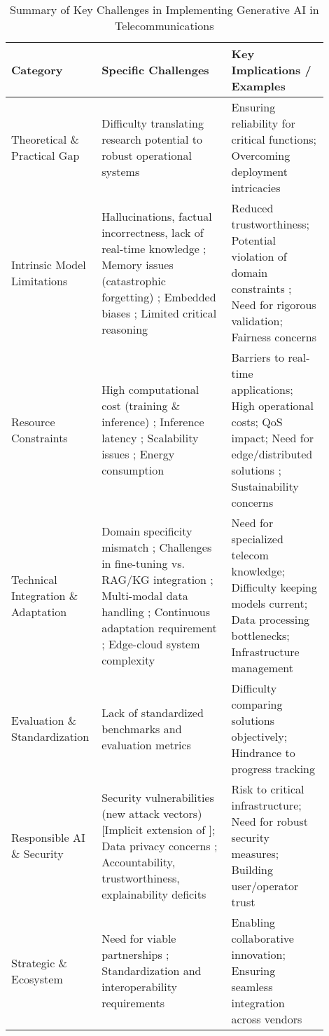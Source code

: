 \documentclass[sigconf]{acmart}
\begin{document}
\begin{table*}[htbp]
\centering
\caption{Summary of Key Challenges in Implementing Generative AI in Telecommunications}
\label{tab:genai_challenges_summary}
\begin{adjustbox}{max width=\textwidth}
\begin{tabular}{|p{0.2\linewidth}|p{0.4\linewidth}|p{0.3\linewidth}|}
\hline
\textbf{Category} & \textbf{Specific Challenges} & \textbf{Key Implications / Examples} \\
\hline
\hline
Theoretical \& Practical Gap & Difficulty translating research potential to robust operational systems \cite{ref2, ref26} & Ensuring reliability for critical functions; Overcoming deployment intricacies \cite{ref6, ref12} \\
\hline
Intrinsic Model Limitations & Hallucinations, factual incorrectness, lack of real-time knowledge \cite{ref8, ref17}; Memory issues (catastrophic forgetting) \cite{ref8}; Embedded biases \cite{ref8}; Limited critical reasoning \cite{ref6} & Reduced trustworthiness; Potential violation of domain constraints \cite{ref17}; Need for rigorous validation; Fairness concerns \\
\hline
Resource Constraints & High computational cost (training \& inference) \cite{ref3, ref8, ref31}; Inference latency \cite{ref3, ref14, ref31}; Scalability issues \cite{ref6, ref9, ref20, ref25, ref31, ref35}; Energy consumption \cite{ref29, ref31, ref34, ref35} & Barriers to real-time applications; High operational costs; QoS impact; Need for edge/distributed solutions \cite{ref3, ref14}; Sustainability concerns \\
\hline
Technical Integration \& Adaptation & Domain specificity mismatch \cite{ref4, ref17, ref18, ref25}; Challenges in fine-tuning vs. RAG/KG integration \cite{ref4, ref8, ref35}; Multi-modal data handling \cite{ref17, ref22, ref23, ref25}; Continuous adaptation requirement \cite{ref17, ref25}; Edge-cloud system complexity \cite{ref3, ref14, ref31} & Need for specialized telecom knowledge; Difficulty keeping models current; Data processing bottlenecks; Infrastructure management \\
\hline
Evaluation \& Standardization & Lack of standardized benchmarks and evaluation metrics \cite{ref18} & Difficulty comparing solutions objectively; Hindrance to progress tracking \\
\hline
Responsible AI \& Security & Security vulnerabilities (new attack vectors) [Implicit extension of \cite{ref20}]; Data privacy concerns \cite{ref12, ref25, ref31, ref34, ref35}; Accountability, trustworthiness, explainability deficits \cite{ref16} & Risk to critical infrastructure; Need for robust security measures; Building user/operator trust \\
\hline
Strategic \& Ecosystem & Need for viable partnerships \cite{ref3}; Standardization and interoperability requirements \cite{ref34} & Enabling collaborative innovation; Ensuring seamless integration across vendors \\
\hline
\end{tabular}
\end{adjustbox}
\end{table*}
\end{document}
